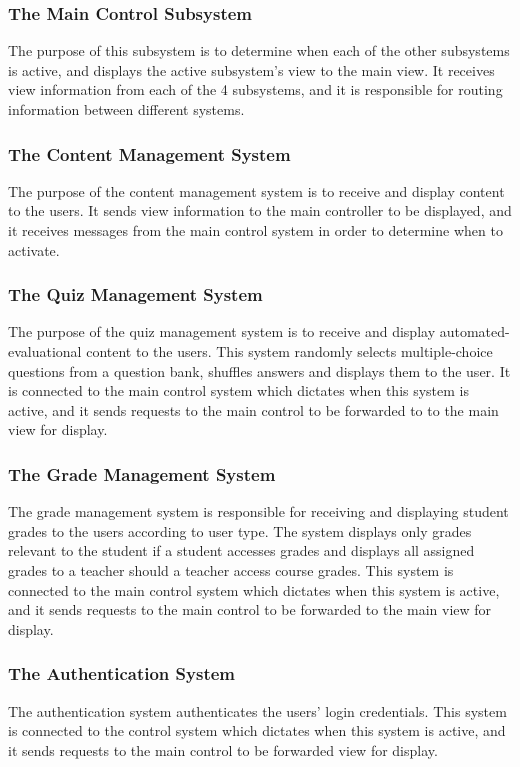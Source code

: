 \documentclass[]{article}
\begin{document}
\subsubsection{The Main Control Subsystem}
The purpose of this subsystem is to determine when each of the other subsystems is active, and displays the active subsystem's view to the main view. It receives view information from each of the 4 subsystems, and it is responsible for routing information between different systems.

\subsubsection{The Content Management System}
The purpose of the content management system is to receive and display content to the users. It sends view information to the main controller to be displayed, and it receives messages from the main control system in order to determine when to activate. 

\subsubsection{The Quiz Management System}
The purpose of the quiz management system is to receive and display 
automated-evaluational content to the users. This system randomly selects 
multiple-choice questions from a question bank, shuffles answers and displays 
them to the user. It is connected to the main control system which dictates when this 
system is active, and it sends requests to the main control to be forwarded to 
 to the main view for display.

\subsubsection{The Grade Management System}
The grade management system is responsible for receiving and displaying student 
grades to the users according to user type. The system displays only grades 
relevant to the student if a student accesses grades and displays all assigned 
grades to a teacher should a teacher access course grades. This system is 
connected to the main control system which dictates when this system is active, and 
it sends requests to the main control to be forwarded to the main view for display.

\subsubsection{The Authentication System}
The authentication system authenticates the users' login credentials. This system is 
connected to the control system which dictates when this system is active, and 
it sends requests to the main control to be forwarded view for display.
\end{document}

